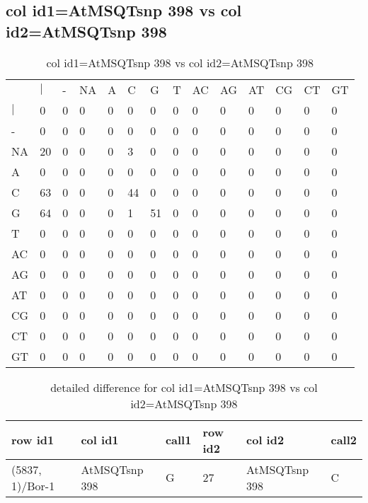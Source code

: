 \subsection{col id1=AtMSQTsnp 398 vs col id2=AtMSQTsnp 398}
\begin{center}
\begin{longtable}{|l|l|l|l|l|l|l|l|l|l|l|l|l|l|}
\caption{col id1=AtMSQTsnp 398 vs col id2=AtMSQTsnp 398} \label{table_dm718}\\
\hline
\\
\hline
&$|$&-&NA&A&C&G&T&AC&AG&AT&CG&CT&GT\\
$|$&0&0&0&0&0&0&0&0&0&0&0&0&0\\
-&0&0&0&0&0&0&0&0&0&0&0&0&0\\
NA&20&0&0&0&3&0&0&0&0&0&0&0&0\\
A&0&0&0&0&0&0&0&0&0&0&0&0&0\\
C&63&0&0&0&44&0&0&0&0&0&0&0&0\\
G&64&0&0&0&1&51&0&0&0&0&0&0&0\\
T&0&0&0&0&0&0&0&0&0&0&0&0&0\\
AC&0&0&0&0&0&0&0&0&0&0&0&0&0\\
AG&0&0&0&0&0&0&0&0&0&0&0&0&0\\
AT&0&0&0&0&0&0&0&0&0&0&0&0&0\\
CG&0&0&0&0&0&0&0&0&0&0&0&0&0\\
CT&0&0&0&0&0&0&0&0&0&0&0&0&0\\
GT&0&0&0&0&0&0&0&0&0&0&0&0&0\\
\hline
\end{longtable}
\end{center}

\begin{center}
\begin{longtable}{|l|l|l|l|l|l|}
\caption{detailed difference for col id1=AtMSQTsnp 398 vs col id2=AtMSQTsnp 398} \label{table_dm719}\\
\hline
row id1&col id1&call1&row id2&col id2&call2\\
\hline
(5837, 1)/Bor-1&AtMSQTsnp 398&G&27&AtMSQTsnp 398&C\\
\hline
\end{longtable}
\end{center}

